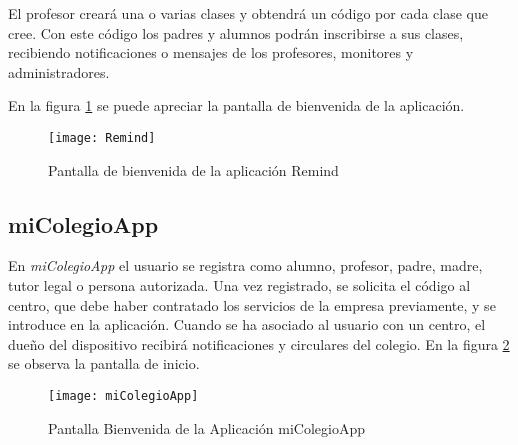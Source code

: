 	\bigskip
	El profesor creará una o varias clases y obtendrá un código por cada clase que cree. Con este código los padres y alumnos podrán inscribirse a sus clases, recibiendo notificaciones o mensajes de los profesores, monitores y administradores. 
	
	En la figura \ref{fig:Remind} se puede apreciar la pantalla de bienvenida de la aplicación.
	
	\begin{figure}[h !]
		\centering
		\texttt{[image: Remind]}
		\caption{Pantalla de bienvenida de la aplicación Remind}
		\label{fig:Remind}
	\end{figure}
	
	\subsection{miColegioApp}
	En {\it miColegioApp} \cite{4:micolegioapp:online} el usuario se registra como alumno, profesor, padre, madre, tutor legal o persona autorizada. Una vez registrado, se solicita el código al centro, que debe haber contratado los servicios de la empresa previamente, y se introduce en la aplicación. Cuando se ha asociado al usuario con un centro, el dueño del dispositivo recibirá notificaciones y circulares del colegio.
	En la figura \ref{fig:miColegioApp} se observa la pantalla de inicio.
	
	\begin{figure}[h !]
		\centering
		\texttt{[image: miColegioApp]}
		\caption{Pantalla Bienvenida de la Aplicación miColegioApp}
		\label{fig:miColegioApp}
	\end{figure}